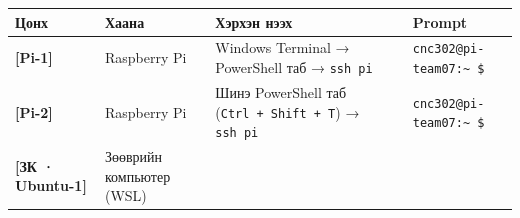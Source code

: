 \begingroup\scriptsize\begin{longtable}[]{@{}llll@{}}
\toprule
\begin{minipage}[b]{0.22\columnwidth}\raggedright
Цонх\strut
\end{minipage} & \begin{minipage}[b]{0.22\columnwidth}\raggedright
Хаана\strut
\end{minipage} & \begin{minipage}[b]{0.22\columnwidth}\raggedright
Хэрхэн нээх\strut
\end{minipage} & \begin{minipage}[b]{0.22\columnwidth}\raggedright
Prompt\strut
\end{minipage}\tabularnewline
\midrule
\endhead
\begin{minipage}[t]{0.22\columnwidth}\raggedright
\textbf{{[}Pi-1{]}}\strut
\end{minipage} & \begin{minipage}[t]{0.22\columnwidth}\raggedright
Raspberry Pi\strut
\end{minipage} & \begin{minipage}[t]{0.22\columnwidth}\raggedright
Windows Terminal → PowerShell таб → \texttt{ssh\ pi}\strut
\end{minipage} & \begin{minipage}[t]{0.22\columnwidth}\raggedright
\texttt{cnc302@pi-team07:\textasciitilde{}\ \$}\strut
\end{minipage}\tabularnewline
\begin{minipage}[t]{0.22\columnwidth}\raggedright
\textbf{{[}Pi-2{]}}\strut
\end{minipage} & \begin{minipage}[t]{0.22\columnwidth}\raggedright
Raspberry Pi\strut
\end{minipage} & \begin{minipage}[t]{0.22\columnwidth}\raggedright
Шинэ PowerShell таб (\texttt{Ctrl\ +\ Shift\ +\ T}) → \texttt{ssh\ pi}\strut
\end{minipage} & \begin{minipage}[t]{0.22\columnwidth}\raggedright
\texttt{cnc302@pi-team07:\textasciitilde{}\ \$}\strut
\end{minipage}\tabularnewline
\begin{minipage}[t]{0.22\columnwidth}\raggedright
\textbf{{[}ЗК · Ubuntu-1{]}}\strut
\end{minipage} & \begin{minipage}[t]{0.22\columnwidth}\raggedright
Зөөврийн компьютер (WSL)\strut

\end{minipage}
\end{longtable}
